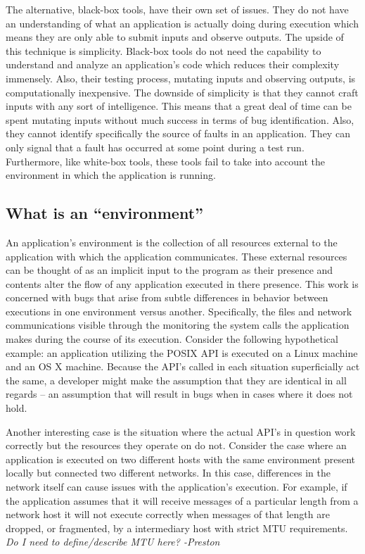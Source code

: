         The alternative, black-box tools, have their own set of issues. They do not have an understanding of what an
        application is actually doing during execution which means they are only able to submit inputs and observe
        outputs.  The upside of this technique is simplicity. Black-box tools do not need the capability to understand
        and analyze an application's code which reduces their complexity immensely. Also, their testing process,
        mutating inputs and observing outputs, is computationally inexpensive. The downside of simplicity is that they
        cannot craft inputs with any sort of intelligence. This means that a great deal of time can be spent mutating
        inputs without much success in terms of bug identification. Also, they cannot identify specifically the source
        of faults in an application. They can only signal that a fault has occurred at some point during a test run.
        Furthermore, like white-box tools, these tools fail to take into account the environment in which the
        application is running.


    \subsection{What is an ``environment''}

    An application's environment is the collection of all resources external to the application with which the
    application communicates.  These external resources can be thought of as an implicit input to the program as their
    presence and contents alter the flow of any application executed in there presence.  This work is concerned with bugs
    that arise from subtle differences in behavior between executions in one environment versus another. Specifically, the
    files and network communications visible through the monitoring the system calls the application makes during the course
    of its execution.  Consider the following hypothetical example: an application utilizing the POSIX API is executed on a
    Linux machine and an OS X machine.  Because the API's called in each situation superficially act the same, a developer might
    make the assumption that they are identical in all regards -- an assumption that will result in bugs when in cases where
    it does not hold.

    Another interesting case is the situation where the actual API's in question work correctly but the resources they
    operate on do not.  Consider the case where an application is executed on two different hosts with the same environment
    present locally but connected two different networks.  In this case, differences in the network itself can cause issues
    with the application's execution.  For example, if the application assumes that it will receive messages of a particular
    length from a network host it will not execute correctly when messages of that length are dropped, or fragmented, by a
    intermediary host with strict MTU requirements. \emph{Do I need to define/describe MTU here? -Preston}


